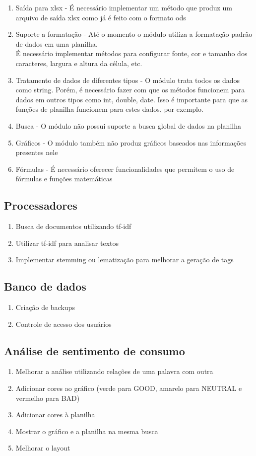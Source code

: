 \begin{enumerate}
\item Saída para xlsx - É necessário implementar um método que produz um arquivo de saída xlsx como já é feito com o formato ods
\item Suporte a formatação - Até o momento o módulo utiliza a formatação padrão de dados em uma planilha.\\ É necessário implementar métodos para configurar fonte, cor e tamanho dos caracteres, largura e altura da célula, etc.
\item Tratamento de dados de diferentes tipos - O módulo trata todos os dados como string. Porém, é necessário fazer com que os métodos funcionem para dados em outros tipos como int, double, date. Isso é importante para que as funções de planilha funcionem para estes dados, por exemplo.
\item Busca - O módulo não possui suporte a busca global de dados na planilha
\item Gráficos - O módulo também não produz gráficos baseados nas informações presentes nele
\item Fórmulas - É necessário oferecer funcionalidades que permitem o uso de fórmulas e funções matemáticas
\end{enumerate}


\subsection{Processadores}
\begin{enumerate}
\item Busca de documentos utilizando tf-idf
\item Utilizar tf-idf para analisar textos
\item Implementar stemming ou lematização para melhorar a geração de tags
\end{enumerate}

\subsection{Banco de dados}
\begin{enumerate}
\item Criação de backups
\item Controle de acesso dos usuários
\end{enumerate}

\subsection{Análise de sentimento de consumo}
\begin{enumerate}
\item Melhorar a análise utilizando relações de uma palavra com outra
\item Adicionar cores ao gráfico (verde para GOOD, amarelo para NEUTRAL e vermelho para BAD)
\item Adicionar cores à planilha
\item Mostrar o gráfico e a planilha na mesma busca
\item Melhorar o layout
\end{enumerate}

